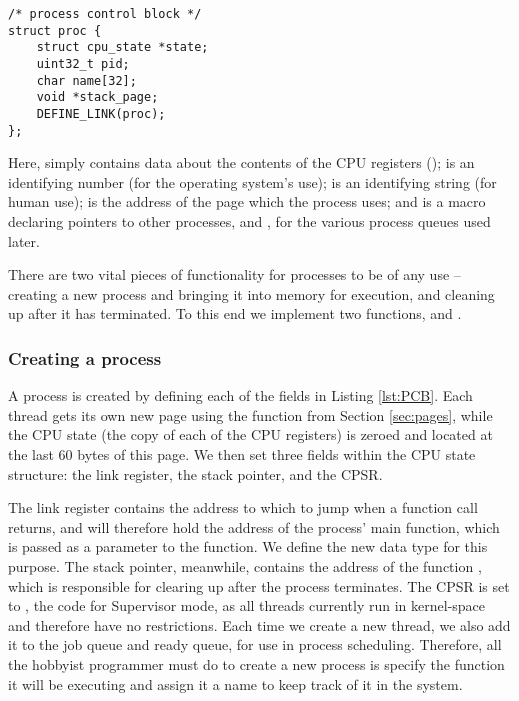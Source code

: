         \lstset{language=c}
        \begin{lstlisting}[caption={A Process Control Block}, captionpos=b,
        label={lst:PCB}]
/* process control block */
struct proc {
    struct cpu_state *state;
    uint32_t pid;
    char name[32];
    void *stack_page;
    DEFINE_LINK(proc);
};
        \end{lstlisting}

        Here,  simply contains data about the contents
        of the CPU registers ();  is an identifying
        number (for the operating system's use);  is an identifying
        string (for human use);  is the address of the page
        which the process uses; and  is a macro
        declaring pointers to other processes,  and , for
        the various process queues used later.

        There are two vital pieces of functionality for processes to be of any
        use -- creating a new process and bringing it into memory for execution,
        and cleaning up after it has terminated. To this end we implement two
        functions,  and .

    \subsubsection{Creating a process}
        A process is created by defining each of the fields in Listing
        \ref{lst:PCB}. Each thread gets its own new page using the
         function from Section \ref{sec:pages}, while the
        CPU state (the copy of each of the CPU registers) is zeroed and located
        at the last 60 bytes of this page. We then set three fields within the
        CPU state structure: the link register, the stack pointer, and the CPSR.

        The link register contains the address to which to jump when a function
        call returns, and will therefore hold the address of the process' main
        function, which is passed as a parameter to the function. We define the
        new data type  for this purpose. The stack pointer,
        meanwhile, contains the address of the function , which is
        responsible for clearing up after the process terminates. The CPSR is
        set to , the code for Supervisor mode, as all threads
        currently run in kernel-space and therefore have no restrictions. Each
        time we create a new thread, we also add it to the job queue and ready
        queue, for use in process scheduling. Therefore, all the hobbyist
        programmer must do to create a new process is specify the function it
        will be executing and assign it a name to keep track of it in the
        system.

